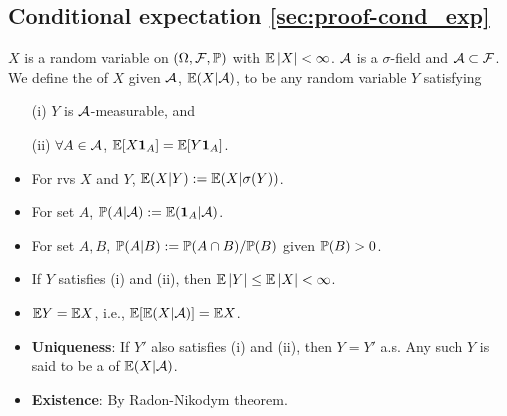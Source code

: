 \documentclass[10pt,a4paper]{article}
\begin{document}
\subsection{Conditional expectation \ref{sec:proof-cond_exp}}\label{sec:cond_exp}
\begin{defbox}
\begin{definition}\label{def:cond_exp}
	$X$ is a random variable on $(\Omega, {\cal F}, \mathbb P)$ with $\mathbb E\left\lvert X\right\rvert<\infty $. ${\cal A}$ is a $\sigma$-field and ${\cal A}\subset {\cal F}$. We define the  of $X$ given ${\cal A}$, $\mathbb E(X|{\cal A})$, to be any random variable $Y$ satisfying
	\begin{enumerate}
		\item[(i)] $Y$ is ${\cal A}$-measurable, and
		\item[(ii)] $\forall A\in{\cal A}$, $\mathbb E[X{\boldsymbol 1}_A]=\mathbb E[Y{\boldsymbol 1}_A]$.    
	\end{enumerate}
	\begin{itemize}
		\item For rvs $X$ and $Y$, $\mathbb E(X|Y):=\mathbb E(X|\sigma(Y))$. 
		\item For set $A$, $\mathbb P(A|{\cal A}):=\mathbb E({\boldsymbol 1}_A|{\cal A})$.
		\item For set $A,B$, $\mathbb P(A|B):=\mathbb P(A\cap B)/\mathbb P(B)$ given $\mathbb P(B)>0$.     
	\end{itemize}
\end{definition}
\end{defbox}
\begin{itemize}
	\item If $Y$ satisfies (i) and (ii), then $\mathbb E \left\lvert Y\right\rvert \leq \mathbb E\left\lvert X\right\rvert<\infty $. 
	\item $\mathbb E Y = \mathbb E X$, i.e., $\mathbb E[\mathbb E(X|{\cal A})]=\mathbb E X$.
	\item \textbf{Uniqueness}: If $Y'$ also satisfies (i) and (ii), then $Y=Y'$ a.s. Any such $Y$ is said to be a  of $\mathbb E(X|{\cal A})$.
	\item \textbf{Existence}: By Radon-Nikodym theorem.
\end{itemize}
\end{document}
